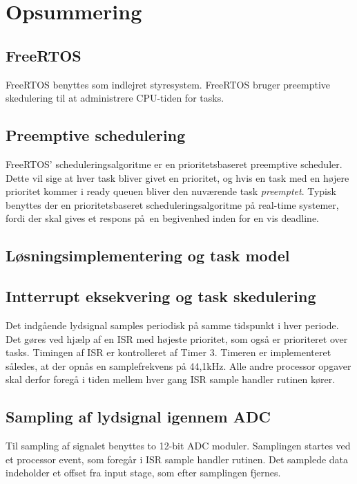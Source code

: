 \section{Opsummering}

\subsection{FreeRTOS}
FreeRTOS benyttes som indlejret styresystem. FreeRTOS bruger preemptive skedulering til at administrere CPU-tiden for tasks. 

\subsection{Preemptive schedulering}
FreeRTOS' scheduleringsalgoritme er en prioritetsbaseret preemptive scheduler.
Dette vil sige at hver task bliver givet en prioritet, og hvis en task med en højere prioritet kommer i ready queuen bliver den nuværende task \textit{preemptet}.
Typisk benyttes der en prioritetsbaseret scheduleringsalgoritme på real-time systemer, fordi der skal gives et respons på en begivenhed inden for en vis deadline.



\subsection{Løsningsimplementering og task model}


\subsection{Intterrupt eksekvering og task skedulering}
Det indgående lydsignal samples periodisk på samme tidspunkt i hver periode. 
Det gøres ved hjælp af en ISR med højeste prioritet, som også er prioriteret over tasks. 
Timingen af ISR er kontrolleret af Timer 3.
Timeren er implementeret således, at der opnås en samplefrekvens på 44,1kHz. 
Alle andre processor opgaver skal derfor foregå i tiden mellem hver gang ISR sample handler rutinen kører. 

\subsection{Sampling af lydsignal igennem ADC}
Til sampling af signalet benyttes to 12-bit ADC moduler. 
Samplingen startes ved et processor event, som foregår i ISR sample handler rutinen. 
Det samplede data indeholder et offset fra input stage, som efter samplingen fjernes. 

